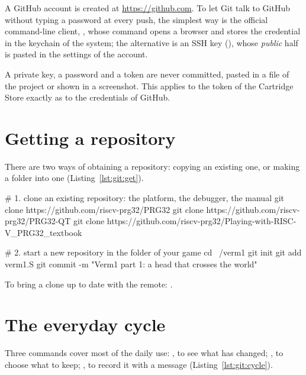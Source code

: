 A GitHub account is created at \url{https://github.com}. To let Git talk to
GitHub without typing a password at every push, the simplest way is the
official command-line client, , whose command 
opens a browser and stores the credential in the keychain of the system; the
alternative is an SSH key (), whose \emph{public}
half is pasted in the settings of the account.

\begin{prgwarn}
A private key, a password and a token are never committed, pasted in a file
of the project or shown in a screenshot. This applies to the token of the
Cartridge Store exactly as to the credentials of GitHub.
\end{prgwarn}

\section{Getting a repository}

There are two ways of obtaining a repository: copying an existing one, or
making a folder into one (Listing~\ref{lst:git:get}).

\begin{shell}[caption={Cloning the platform; starting a project of one's own.},label=lst:git:get]
# 1. clone an existing repository: the platform, the debugger, the manual
git clone https://github.com/riscv-prg32/PRG32
git clone https://github.com/riscv-prg32/PRG32-QT
git clone https://github.com/riscv-prg32/Playing-with-RISC-V_PRG32_textbook

# 2. start a new repository in the folder of your game
cd ~/verm1
git init
git add verm1.S
git commit -m "Verm1 part 1: a head that crosses the world"
\end{shell}

To bring a clone up to date with the remote: .

\section{The everyday cycle}

Three commands cover most of the daily use: , to see what has
changed; , to choose what to keep; , to record it with
a message (Listing~\ref{lst:git:cycle}).


